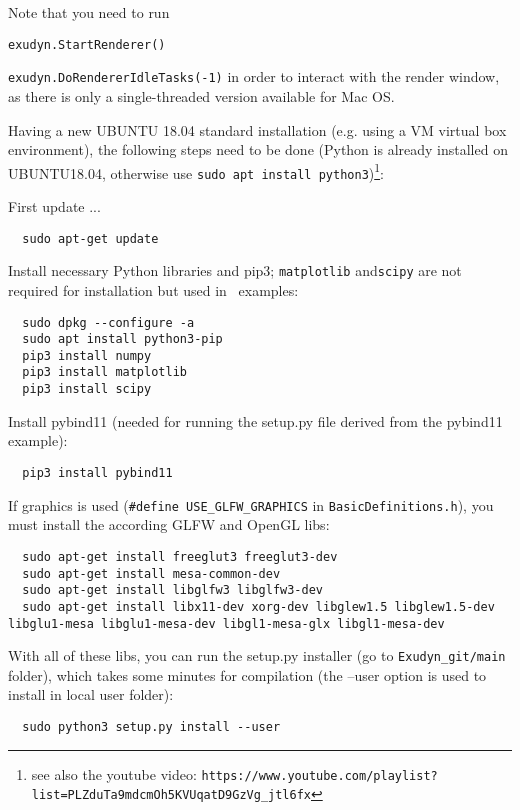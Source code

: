 \noindent Note that you need to run 
\bi
\item[] \texttt{exudyn.StartRenderer()}
\item[] \texttt{exudyn.DoRendererIdleTasks(-1)}
\ei
in order to interact with the render window, as there is only a single-threaded version available for Mac OS.

\label{sec:build:ubuntu}
Having a new UBUNTU 18.04 standard installation (e.g. using a VM virtual box environment), the following steps need to be done (Python  is already installed on UBUNTU18.04, otherwise use \texttt{sudo apt install python3})\footnote{see also the youtube video: \texttt{https://www.youtube.com/playlist?list=PLZduTa9mdcmOh5KVUqatD9GzVg\_jtl6fx}}:

\noindent First update ...
\plainlststyle
\begin{lstlisting}
  sudo apt-get update
\end{lstlisting}

\noindent 
Install necessary Python libraries and pip3; \texttt{matplotlib} and\texttt{scipy} are not required for installation but used in \codeName\ examples:
\begin{lstlisting}
  sudo dpkg --configure -a
  sudo apt install python3-pip
  pip3 install numpy
  pip3 install matplotlib
  pip3 install scipy
\end{lstlisting}

\noindent Install pybind11 (needed for running the setup.py file derived from the pybind11 example):
\begin{lstlisting}
  pip3 install pybind11
\end{lstlisting}

\noindent 
If graphics is used (\texttt{\#define USE\_GLFW\_GRAPHICS} in \texttt{BasicDefinitions.h}), you must install the according GLFW and OpenGL libs:
\begin{lstlisting}
  sudo apt-get install freeglut3 freeglut3-dev
  sudo apt-get install mesa-common-dev
  sudo apt-get install libglfw3 libglfw3-dev
  sudo apt-get install libx11-dev xorg-dev libglew1.5 libglew1.5-dev libglu1-mesa libglu1-mesa-dev libgl1-mesa-glx libgl1-mesa-dev
\end{lstlisting}

\noindent 
With all of these libs, you can run the setup.py installer (go to \texttt{Exudyn\_git/main} folder), which takes some minutes for compilation (the --user option is used to install in local user folder):
\begin{lstlisting}
  sudo python3 setup.py install --user
\end{lstlisting}

